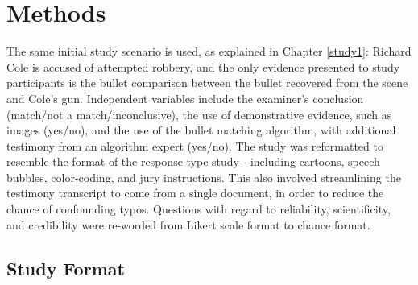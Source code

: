 \documentclass[print]{nuthesis}
\begin{document}
\hypertarget{methods-3}{%
\section{Methods}\label{methods-3}}

The same initial study scenario is used, as explained in Chapter \ref{study1}: Richard Cole is accused of attempted robbery, and the only evidence presented to study participants is the bullet comparison between the bullet recovered from the scene and Cole's gun.
Independent variables include the examiner's conclusion (match/not a match/inconclusive), the use of demonstrative evidence, such as images (yes/no), and the use of the bullet matching algorithm, with additional testimony from an algorithm expert (yes/no).
The study was reformatted to resemble the format of the response type study - including cartoons, speech bubbles, color-coding, and jury instructions.
This also involved streamlining the testimony transcript to come from a single document, in order to reduce the chance of confounding typos.
Questions with regard to reliability, scientificity, and credibility were re-worded from Likert scale format to chance format.

\hypertarget{study-format-2}{%
\subsection{Study Format}\label{study-format-2}}
\end{document}
